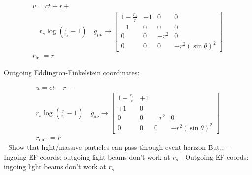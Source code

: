$$
    \begin{array}{l}
        v=c t+r+                                                                                                                         \\
        \quad r_s \log \left(\frac{r}{r_s}-1\right) \quad g_{\mu \nu} \rightarrow\left[\begin{array}{cccc}
                                                                                               1-\frac{r_s}{r} & -1 & 0    & 0                   \\
                                                                                               -1              & 0  & 0    & 0                   \\
                                                                                               0               & 0  & -r^2 & 0                   \\
                                                                                               0               & 0  & 0    & -r^2(\sin \theta)^2
                                                                                           \end{array}\right] \\
        r_{\text {in }}=r
    \end{array}
$$

Outgoing Eddington-Finkelstein coordinates:

$$
    \begin{array}{l}
        u=c t-r-                                                                                                                   \\
        r_s \log \left(\frac{r}{r_s}-1\right) \quad g_{\mu \nu} \rightarrow\left[\begin{array}{cccc}
                                                                                         1-\frac{r_s}{r} & +1                              \\
                                                                                         +1              & 0                               \\
                                                                                         \hline 0        & 0  & -r^2 & 0                   \\
                                                                                         0               & 0  & 0    & -r^2(\sin \theta)^2
                                                                                     \end{array}\right] \\
        r_{\text {out }}=r
    \end{array}
$$
- Show that light/massive particles can pass through event horizon
But...
- Ingoing EF coords: outgoing light beams don't work at $r_s$
- Outgoing EF coords: ingoing light beams don't work at $r_s$

